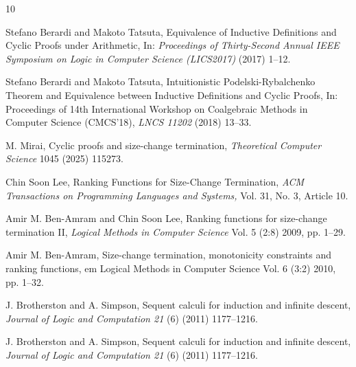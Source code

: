 
\begin{thebibliography}{10}

	Stefano Berardi and Makoto Tatsuta,
	Equivalence of Inductive Definitions and Cyclic Proofs under Arithmetic,
	In: {\em Proceedings of Thirty-Second Annual IEEE Symposium on 
	Logic in Computer Science (LICS2017)} (2017) 1--12.

	Stefano Berardi and Makoto Tatsuta,
	Intuitionistic Podelski-Rybalchenko Theorem and Equivalence between 
	Inductive Definitions and Cyclic Proofs,
	In: Proceedings of 14th International Workshop on Coalgebraic Methods 
	in Computer Science (CMCS'18), {\em LNCS 11202} (2018) 13--33.

M. Mirai, Cyclic proofs and size-change termination,
{\em Theoretical Computer Science} 1045 (2025) 115273.

Chin Soon Lee,
Ranking Functions for Size-Change Termination,
{\em ACM Transactions on Programming Languages and Systems,} Vol. 31, No. 3, Article 10.

Amir M. Ben-Amram and Chin Soon Lee,
Ranking functions for size-change termination II,
{\em Logical Methods in Computer Science}
Vol. 5 (2:8) 2009, pp. 1–29.

Amir M. Ben-Amram,
Size-change termination, monotonicity constraints
and ranking functions,
{em Logical Methods in Computer Science}
Vol. 6 (3:2) 2010, pp. 1–32.

J. Brotherston and A. Simpson,
Sequent calculi for induction and infinite descent,
{\em Journal of Logic and Computation 21} (6) (2011) 1177--1216.

J. Brotherston and A. Simpson,
Sequent calculi for induction and infinite descent,
{\em Journal of Logic and Computation 21} (6) (2011) 1177--1216.

\end{thebibliography}
